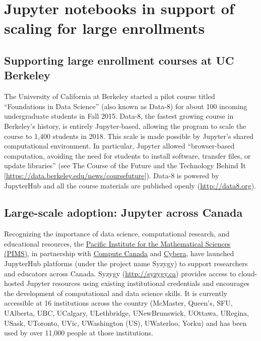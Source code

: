 \documentclass[]{book}
\begin{document}
\hypertarget{jupyter-notebooks-in-support-of-scaling-for-large-enrollments}{%
\section{Jupyter notebooks in support of scaling for large enrollments}\label{jupyter-notebooks-in-support-of-scaling-for-large-enrollments}}

\hypertarget{supporting-large-enrollment-courses-at-uc-berkeley}{%
\subsection{Supporting large enrollment courses at UC Berkeley}\label{supporting-large-enrollment-courses-at-uc-berkeley}}

The University of California at Berkeley started a pilot course titled
``Foundations in Data Science'' (also known as Data-8) for about 100
incoming undergraduate students in Fall 2015. Data-8, the fastest
growing course in Berkeley's history, is entirely Jupyter-based,
allowing the program to scale the course to 1,400 students in 2018.
This scale is made possible by Jupyter's shared computational
environment. In particular, Jupyter allowed ``browser-based
computation, avoiding the need for students to install software,
transfer files, or update libraries'' (see The Course of the Future and
the Technology Behind It
{[}\url{https://data.berkeley.edu/news/coursefuture}{]}). Data-8
is powered by JupyterHub and all the course materials are published
openly (\url{http://data8.org}).

\hypertarget{large-scale-adoption-jupyter-across-canada}{%
\subsection{Large-scale adoption: Jupyter across Canada}\label{large-scale-adoption-jupyter-across-canada}}

Recognizing the importance of data science, computational research,
and educational resources, the \href{https://www.pims.math.ca/}{Pacific Institute for the Mathematical
Sciences (PIMS)}, in partnership with
\href{https://www.computecanada.ca/}{Compute Canada} and
\href{https://www.cybera.ca/}{Cybera}, have launched JupyterHub platforms
(under the project name Syzygy) to support researchers and educators
across Canada. Syzygy (\url{http://syzygy.ca}) provides
access to cloud-hosted Jupyter resources using existing institutional
credentials and encourages the development of computational and data
science skills. It is currently accessible at 16 institutions across
the country (McMaster, Queen's, SFU, UAlberta, UBC, UCalgary,
ULethbridge, UNewBrunswick, UOttawa, URegina, USask, UToronto, UVic,
UWashington (US), UWaterloo, Yorku) and has been used by over 11,000
people at those institutions.
\end{document}
